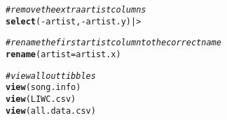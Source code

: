 \documentclass{article}\usepackage[]{graphicx}\usepackage[]{xcolor}
\makeatletter
\newcommand{\hlcom}[1]{\textcolor[rgb]{0.678,0.584,0.686}{\textit{#1}}}%
\newcommand{\hlopt}[1]{\textcolor[rgb]{0,0,0}{#1}}%
\newcommand{\hldef}[1]{\textcolor[rgb]{0.345,0.345,0.345}{#1}}%
\newcommand{\hlkwc}[1]{\textcolor[rgb]{0.333,0.667,0.333}{#1}}%
\newcommand{\hlkwd}[1]{\textcolor[rgb]{0.737,0.353,0.396}{\textbf{#1}}}%
\newenvironment{kframe}{%
 \def\at@end@of@kframe{}%
 \ifinner\ifhmode%
  \def\at@end@of@kframe{\end{minipage}}%
  \begin{minipage}{\columnwidth}%
 \fi\fi%
 \def\FrameCommand##1{\hskip\@totalleftmargin \hskip-\fboxsep
 \colorbox{shadecolor}{##1}\hskip-\fboxsep
     \hskip-\linewidth \hskip-\@totalleftmargin \hskip\columnwidth}%
 \MakeFramed {\advance\hsize-\width
   \@totalleftmargin\z@ \linewidth\hsize
   \@setminipage}}%
 {\par\unskip\endMakeFramed%
 \at@end@of@kframe}
\newenvironment{knitrout}{}{} %
\makeatother
\begin{document}
\begin{enumerate}
\begin{knitrout}
\begin{kframe}
\begin{alltt}
  \hlcom{#remove the extra artist columns}
  \hlkwd{select}\hldef{(}\hlopt{-}\hldef{artist,} \hlopt{-}\hldef{artist.y) |>}

  \hlcom{#rename the first artist column to the correct name}
  \hlkwd{rename}\hldef{(}\hlkwc{artist} \hldef{= artist.x)}



\hlcom{#view all out tibbles}
\hlkwd{view}\hldef{(song.info)}
\hlkwd{view}\hldef{(LIWC.csv)}
\hlkwd{view}\hldef{(all.data.csv)}
\end{alltt}
\end{kframe}
\end{knitrout}
\end{enumerate}

\end{document}

